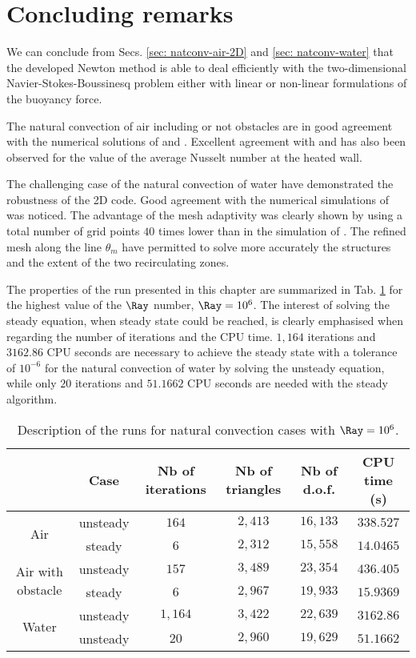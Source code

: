 \newpage
\section{Concluding remarks}

We can conclude from Secs. \ref{sec: natconv-air-2D} and \ref{sec: natconv-water} that the developed Newton method is able to deal  efficiently with the two-dimensional Navier-Stokes-Boussinesq problem either with linear or non-linear formulations of the buoyancy force.

\noindent The natural convection of air including or not obstacles are in good agreement with the numerical solutions of \cite{LeQuere91} and \cite{Raluca2013}.
Excellent agreement with \cite{de1983natural} and \cite{LeQuere91} has also been observed for the value of the average Nusselt number at the heated wall. 

\noindent The challenging case of the natural convection of water have demonstrated the robustness of the 2D code. 
Good agreement with the numerical simulations of \cite{Kowalewski-2003} was noticed. 
The advantage of the mesh adaptivity was clearly shown by using a total number of grid points $40$ times lower than in the simulation of \cite{Kowalewski-2003}.
The refined mesh along the line $\theta_m$ have permitted to solve more accurately the structures and the extent of the two recirculating zones.

The properties of the run presented in this chapter are summarized in Tab. \ref{tab-natconv-cases} for the highest value of the $\Ray$ number, $\Ray = 10^6$.
The interest of solving the steady equation, when steady state could be reached, is clearly emphasised when regarding the number of iterations and the CPU time.
$1,164$ iterations and $3162.86$ CPU seconds are necessary to achieve the steady state with a tolerance of $10^{-6}$ for the natural convection of water by solving the unsteady equation,
while only $20$ iterations and $51.1662$ CPU seconds are needed with the steady algorithm.

\begin{table}[!ht]
\centering
\begin{tabular}{*{6}{c}}
  & Case & {\small Nb of iterations} & {\small Nb of triangles} & {\small Nb of d.o.f.} & {\small CPU time (s)}   \\
  \toprule 
  \multirow{2}{*}{Air} & unsteady & $164$ & $2,413$ & $16,133$ & $338.527$ \\
   & steady & $6$ & $2,312$ & $15,558$ & $14.0465$ \\
  \hline
  \multirow{2}{*}{Air with obstacle} & unsteady & $157$ & $3,489$ & $23,354$ & $436.405$ \\
  & steady & $6$ & $2,967$ & $19,933$ & $15.9369$ \\
  \hline
  \multirow{2}{*}{Water} & unsteady & $1,164$ & $3,422$ & $22,639$ & $3162.86$ \\
   & unsteady & $20$ & $2,960$ & $19,629$ & $51.1662$ \\

\bottomrule
 \end{tabular}
\caption{Description of the runs for natural convection cases with $\Ray = 10^6$.}
\label{tab-natconv-cases}
\end{table}

